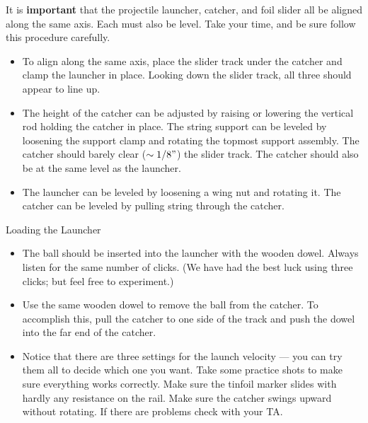 It is {\bf important} that the projectile launcher, catcher, and foil
slider all be aligned along the same axis.  Each must also be
level.  Take your time, and be sure follow this procedure carefully.

	\begin{itemize}

	\item  To align along the same axis, place the slider track
	under the catcher and clamp the launcher in place.  Looking
         down the slider track, all three should appear to line up.
	
	\item The height of the catcher can be adjusted by raising or
	lowering the vertical rod holding the catcher in place. 
       The string support 
        can be leveled by loosening the support clamp and rotating the
        topmost support assembly.  The
	catcher should barely clear ($\sim 1/8"$) the slider
	track.  The catcher should also be at the same level as the
	launcher.
	
	\item The launcher can be leveled by loosening a wing nut
and rotating it.
	The catcher can be leveled
        by pulling string through the catcher.  
	
	\end{itemize}


\item Loading the Launcher

	\begin{itemize}

	\item The ball should be inserted into the launcher with the
        wooden dowel.  Always listen for the same number of clicks.
        (We have had the best luck using three clicks; but feel free
        to experiment.)

	\item  Use the same wooden dowel to remove the ball from the
        catcher.  To accomplish this, pull the catcher to one side of
        the track and push the dowel into the far end of the catcher.
	
	\item Notice that there are three settings for the launch
        velocity --- you can try them all to decide which one you
        want.  Take some practice shots to make sure everything works
        correctly.  Make sure the tinfoil marker slides with hardly
        any resistance on the rail.  Make sure the catcher swings
        upward without rotating.  If there are problems check with
        your TA.
	
	\end{itemize}


